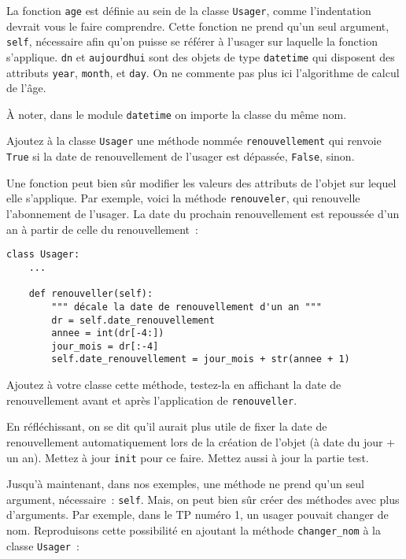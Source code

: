 \documentclass[10pt,a4paper]{sujets-exercices}
\begin{document}
La fonction \texttt{age} est définie au sein de la classe \texttt{Usager}, comme l'indentation devrait vous le faire comprendre. Cette fonction ne prend qu'un seul argument, \texttt{self}, nécessaire afin qu'on puisse se référer à l'usager sur laquelle la fonction s'applique. \texttt{dn} et \texttt{aujourdhui} sont des objets de type \texttt{datetime} qui disposent des attributs \texttt{year}, \texttt{month}, et \texttt{day}. On ne commente pas plus ici l'algorithme de calcul de l'âge. 

À noter, dans le module \verb!datetime! on importe la classe du même nom.

\exercice{} Ajoutez à la classe \texttt{Usager} une méthode nommée \texttt{renouvellement} qui renvoie \texttt{True} si la date de renouvellement de l'usager est dépassée, \texttt{False}, sinon.

Une fonction peut bien sûr modifier les valeurs des attributs de l'objet sur lequel elle s'applique. Par exemple, voici la méthode \texttt{renouveler}, qui renouvelle l'abonnement de l'usager. La date du prochain renouvellement est repoussée d'un an à partir de celle du renouvellement~: 

\begin{verbatim}
class Usager:
    ...
    
    def renouveller(self):
        """ décale la date de renouvellement d'un an """
        dr = self.date_renouvellement 
        annee = int(dr[-4:])
        jour_mois = dr[:-4]
        self.date_renouvellement = jour_mois + str(annee + 1)
\end{verbatim}

\exercice{} Ajoutez à votre classe cette méthode, testez-la en affichant la date de renouvellement avant et après  l'application de \texttt{renouveller}.

\exercice{} En réfléchissant, on se dit qu'il aurait plus utile de fixer la date de renouvellement automatiquement lors de la création de l'objet (à date du jour + un an). Mettez à jour \texttt{init} pour ce faire. Mettez aussi à jour la partie test.

Jusqu'à maintenant, dans nos exemples, une méthode ne prend qu'un seul argument, nécessaire~: \texttt{self}. Mais, on peut bien sûr créer des méthodes avec plus d'arguments. Par exemple, dans le TP numéro 1, un usager pouvait changer de nom. Reproduisons cette possibilité en ajoutant la méthode \texttt{changer\_nom} à la classe \texttt{Usager}~:
\end{document}

